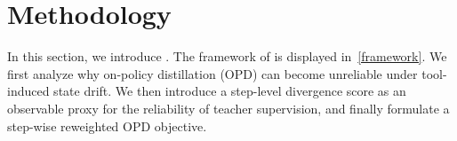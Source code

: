 
\section{Methodology}

In this section, we introduce \ourmodel.
The framework of \ourmodel is displayed in~\cref{framework}.
We first analyze why on-policy distillation (OPD) can become unreliable under tool-induced state drift. We then introduce a step-level divergence score as an observable proxy for the reliability of teacher supervision, and finally formulate a step-wise reweighted OPD objective.
















